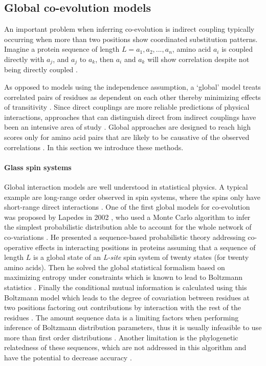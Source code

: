 \subsection{Global co-evolution models \label{sec:coevGlobal}}

An important problem when inferring co-evolution is indirect coupling typically occurring when more than two positions show coordinated substitution patterns.
Imagine a protein sequence of length $L = a_1, a_2, ... , a_n$, amino acid $a_i$ is coupled directly with $a_j$, and $a_j$ to $a_k$, then $a_i$ and $a_k$ will show correlation despite not being directly coupled \cite{weigt2009identification}.

As opposed to models using the independence assumption, a `global' model treats correlated pairs of residues as dependent on each other thereby minimizing effects of transitivity  \cite{marks2012protein}.
Since direct couplings are more reliable predictions of physical interactions, approaches that can distinguish direct from indirect couplings have been an intensive area of study \cite{de2013emerging}.
Global approaches are designed to reach high scores only for amino acid pairs that are likely to be causative of the observed correlations  \cite{marks2012protein}.
In this section we introduce these methods.


\paragraph{Glass spin systems}
Global interaction models are well understood in statistical physics.
A typical example are long-range order observed in spin systems, where the spins only have short-range direct interactions \cite{binney1992theory}.
One of the first global models for co-evolution was proposed by Lapedes in 2002 \cite{lapedes2012using}, who used a Monte Carlo algorithm to infer the simplest probabilistic distribution able to account for the whole network of co‐variations \cite{de2013emerging}.
He presented a sequence-based probabilistic theory addressing co-operative effects in interacting positions in proteins assuming that a sequence of length $L$ is a global state of an \textit{L-site} spin system of twenty states (for twenty amino acids).
Then he solved the global statistical formalism based on maximizing entropy under constraints which is known to lead to Boltzmann statistics \cite{marks2012protein}.
Finally the conditional mutual information is calculated using this Boltzmann model which leads to the degree of covariation between residues at two positions factoring out contributions by interaction with the rest of the residues \cite{marks2012protein}.
The amount sequence data is a limiting factors when performing inference of Boltzmann distribution parameters, thus it is usually infeasible to use more than first order distributions \cite{lapedes2012using}.
Another limitation is the phylogenetic relatedness of these sequences, which are not addressed in this algorithm and have the potential to decrease accuracy \cite{lapedes2012using}.

